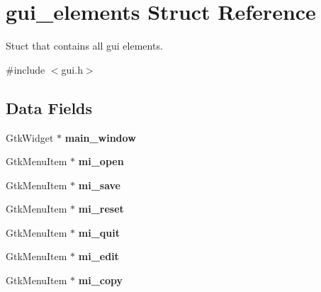 \hypertarget{structgui__elements}{}\section{gui\+\_\+elements Struct Reference}
\label{structgui__elements}


Stuct that contains all gui elements.  




{\ttfamily \#include $<$gui.\+h$>$}

\subsection*{Data Fields}
\begin{DoxyCompactItemize}
\item 
\mbox{\label{structgui__elements_afbc30a8bd582ef68bccf206a4a254102}} 
Gtk\+Widget $\ast$ {\bfseries main\+\_\+window}
\item 
\mbox{\label{structgui__elements_a673c81fdedb38de9dc315e4fbaa02e9b}} 
Gtk\+Menu\+Item $\ast$ {\bfseries mi\+\_\+open}
\item 
\mbox{\label{structgui__elements_ae031252864edd8e76e02ec8d0001e917}} 
Gtk\+Menu\+Item $\ast$ {\bfseries mi\+\_\+save}
\item 
\mbox{\label{structgui__elements_a45b0553cd0a084fb3ff4d17430dc33a4}} 
Gtk\+Menu\+Item $\ast$ {\bfseries mi\+\_\+reset}
\item 
\mbox{\label{structgui__elements_a7a91bbee437343b304c13a211f3b6efb}} 
Gtk\+Menu\+Item $\ast$ {\bfseries mi\+\_\+quit}
\item 
\mbox{\label{structgui__elements_a76bd90aa7cc6eb2cf54bf5c3c41e10fb}} 
Gtk\+Menu\+Item $\ast$ {\bfseries mi\+\_\+edit}
\item 
\mbox{\label{structgui__elements_ae6b04ac6453843c32b3257803b4ddd19}} 
Gtk\+Menu\+Item $\ast$ {\bfseries mi\+\_\+copy}
\item 
\mbox{\label{structgui__elements_ae2836b2adf9d5e08b9c8f00632aeb3d7}} 

\end{DoxyCompactItemize}
